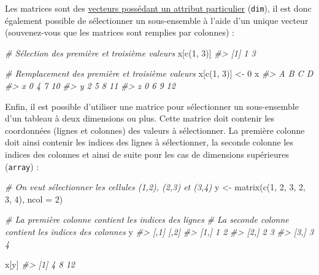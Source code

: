 \documentclass[
  french,
]{scrbook}
\newenvironment{Shaded}{\begin{snugshade}}{\end{snugshade}}
\newcommand{\AttributeTok}[1]{\textcolor[rgb]{0.77,0.63,0.00}{#1}}
\newcommand{\CommentTok}[1]{\textcolor[rgb]{0.56,0.35,0.01}{\textit{#1}}}
\newcommand{\DecValTok}[1]{\textcolor[rgb]{0.00,0.00,0.81}{#1}}
\newcommand{\FunctionTok}[1]{\textcolor[rgb]{0.00,0.00,0.00}{#1}}
\newcommand{\NormalTok}[1]{#1}
\newcommand{\OtherTok}[1]{\textcolor[rgb]{0.56,0.35,0.01}{#1}}
\begin{document}
Les matrices sont des \protect\hyperlink{r-matrix}{vecteurs possédant un attribut particulier} (\texttt{dim}), il est donc également possible de sélectionner un sous-ensemble à l'aide d'un unique vecteur (souvenez-vous que les matrices sont remplies par colonnes) :

\begin{Shaded}
\begin{Highlighting}[]
\CommentTok{\# Sélection des première et troisième valeurs}
\NormalTok{x[}\FunctionTok{c}\NormalTok{(}\DecValTok{1}\NormalTok{, }\DecValTok{3}\NormalTok{)]}
\CommentTok{\#\textgreater{} [1] 1 3}

\CommentTok{\# Remplacement des première et troisième valeurs}
\NormalTok{x[}\FunctionTok{c}\NormalTok{(}\DecValTok{1}\NormalTok{, }\DecValTok{3}\NormalTok{)] }\OtherTok{\textless{}{-}} \DecValTok{0}
\NormalTok{x}
\CommentTok{\#\textgreater{}   A B C  D}
\CommentTok{\#\textgreater{} x 0 4 7 10}
\CommentTok{\#\textgreater{} y 2 5 8 11}
\CommentTok{\#\textgreater{} z 0 6 9 12}
\end{Highlighting}
\end{Shaded}

Enfin, il est possible d'utiliser une matrice pour sélectionner un sous-ensemble d'un tableau à deux dimensions ou plus. Cette matrice doit contenir les coordonnées (lignes et colonnes) des valeurs à sélectionner. La première colonne doit ainsi contenir les indices des lignes à sélectionner, la seconde colonne les indices des colonnes et ainsi de suite pour les cas de dimensions supérieures (\texttt{array}) :

\begin{Shaded}
\begin{Highlighting}[]
\CommentTok{\# On veut sélectionner les cellules (1,2), (2,3) et (3,4)}
\NormalTok{y }\OtherTok{\textless{}{-}} \FunctionTok{matrix}\NormalTok{(}\FunctionTok{c}\NormalTok{(}\DecValTok{1}\NormalTok{, }\DecValTok{2}\NormalTok{, }\DecValTok{3}\NormalTok{, }\DecValTok{2}\NormalTok{, }\DecValTok{3}\NormalTok{, }\DecValTok{4}\NormalTok{), }\AttributeTok{ncol =} \DecValTok{2}\NormalTok{)}

\CommentTok{\# La première colonne contient les indices des lignes}
\CommentTok{\# La seconde colonne contient les indices des colonnes}
\NormalTok{y}
\CommentTok{\#\textgreater{}      [,1] [,2]}
\CommentTok{\#\textgreater{} [1,]    1    2}
\CommentTok{\#\textgreater{} [2,]    2    3}
\CommentTok{\#\textgreater{} [3,]    3    4}

\NormalTok{x[y]}
\CommentTok{\#\textgreater{} [1]  4  8 12}
\end{Highlighting}
\end{Shaded}
\end{document}

